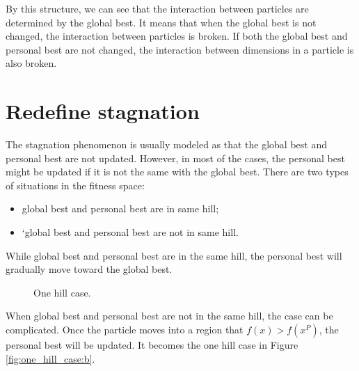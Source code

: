 \documentclass[10pt,a4paper]{article}
\begin{document}
By this structure, we can see that the interaction between particles are determined by the global best.
It means that when the global best is not changed, the interaction between particles is broken.
If both the global best and personal best are not changed, the interaction between dimensions in a particle is also broken.

\section{Redefine stagnation}

The stagnation phenomenon is usually modeled as that the global best and personal best are not updated.
However, in most of the cases, the personal best might be updated if it is not the same with the global best.
There are two types of situations in the fitness space:
\begin{itemize}
\item global best and personal best are in same hill;
\item`global best and personal best are not in same hill.
\end{itemize}

While global best and personal best are in the same hill, the personal best will gradually move toward the global best.

\begin{figure} \centering
{}
\caption{One hill case.}
\label{fig:one_hill_case}
\end{figure}

When global best and personal best are not in the same hill, the case can be complicated.
Once the particle moves into a region that $ f(x) > f(x^{P}) $, the personal best will be updated.
It becomes the one hill case in Figure \ref{fig:one_hill_case:b}.
\end{document}
